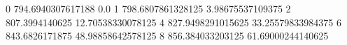0 794.6940307617188 0.0
1 798.6807861328125 3.98675537109375
2 807.3994140625 12.70538330078125
4 827.9498291015625 33.25579833984375
6 843.6826171875 48.98858642578125
8 856.384033203125 61.69000244140625
